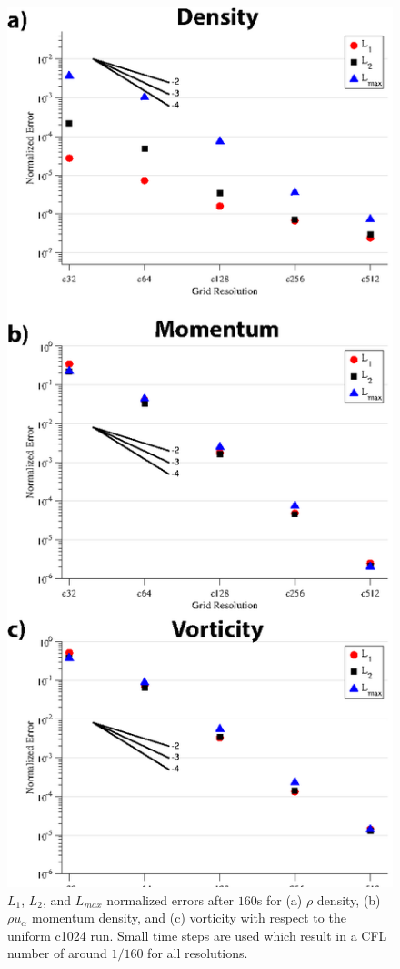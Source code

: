 \begin{figure}
    \centerline{%
    \noindent
    \includegraphics[height=.9\textheight]{Chap3/smalldt_normerrs-01.eps}}
    \caption{$L_1$, $L_2$, and $L_{max}$ normalized errors after $160$s 
    for (a) $\rho$ density, (b) $\rho u_\alpha$ momentum density, and (c) vorticity with
    respect to the uniform c1024 run. Small time steps are used which result in
     a CFL number of around $1/160$ for all resolutions.
}%
    \label{fig:smalldterror}
\end{figure}


